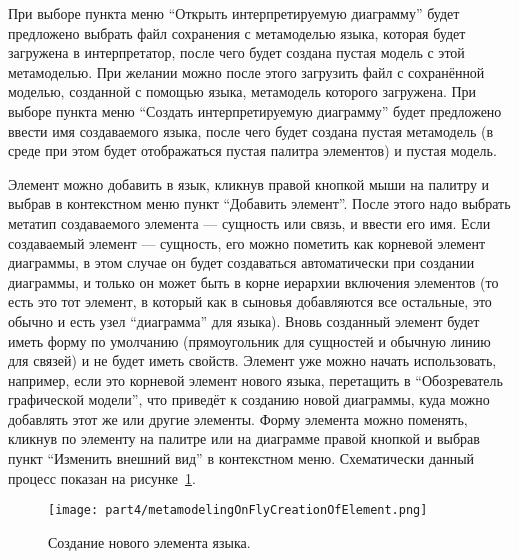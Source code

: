 При выборе пункта меню "`Открыть интерпретируемую диаграмму"' будет предложено выбрать 
файл сохранения с метамоделью языка, которая будет загружена в интерпретатор, после 
чего будет создана пустая модель с этой метамоделью. При желании можно после этого 
загрузить файл с сохранённой моделью, созданной с помощью языка, метамодель которого 
загружена. При выборе пункта меню "`Создать интерпретируемую диаграмму"' будет предложено 
ввести имя создаваемого языка, после чего будет создана пустая метамодель (в среде 
при этом будет отображаться пустая палитра элементов) и пустая модель.

Элемент можно добавить в язык, кликнув правой кнопкой мыши на палитру и выбрав в контекстном 
меню пункт "`Добавить элемент"'. После этого надо выбрать метатип создаваемого элемента 
--- сущность или связь, и ввести его имя. Если создаваемый элемент --- сущность, его
можно пометить как корневой элемент диаграммы, в этом случае он будет создаваться 
автоматически при создании диаграммы, и только он может быть в корне иерархии включения 
элементов (то есть это тот элемент, в который как в сыновья добавляются все остальные, 
это обычно и есть узел "`диаграмма"' для языка). Вновь созданный элемент будет иметь 
форму по умолчанию (прямоугольник для сущностей и обычную линию для связей) и не будет 
иметь свойств. Элемент уже можно начать использовать, например, если это корневой 
элемент нового языка, перетащить в "`Обозреватель графической модели"', что приведёт 
к созданию новой диаграммы, куда можно добавлять этот же или другие элементы. Форму 
элемента можно поменять, кликнув по элементу на палитре или на диаграмме правой кнопкой 
и выбрав пункт "`Изменить внешний вид"' в контекстном меню. Схематически данный процесс 
показан на рисунке~\ref{image:metamodelingOnFlyCreationOfElement}.

\begin{figure} [ht]
	\begin{center}
		\texttt{[image: part4/metamodelingOnFlyCreationOfElement.png]}
		\caption{Создание нового элемента языка.}
		\label{image:metamodelingOnFlyCreationOfElement}
	\end{center}
\end{figure}

